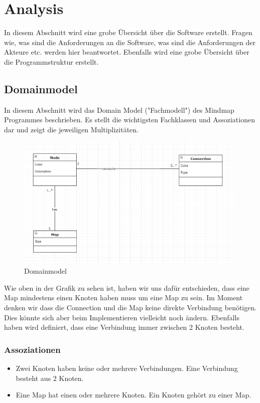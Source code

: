 \chapter{Analysis}
\label{chap:analysis}

In diesem Abschnitt wird eine grobe Übersicht über die Software erstellt. Fragen wie, was sind die Anforderungen an die Software, was sind die Anforderungen der Akteure etc. werden hier beantwortet. Ebenfalls wird eine grobe Übersicht über die Programmstruktur erstellt.

\section{Domainmodel}
\label{sec:domain_model}
In diesem Abschnitt wird das Domain Model ("{}Fachmodell"{}) des Mindmap Programmes beschrieben. Es stellt die 
wichtigsten Fachklassen und Assoziationen dar und zeigt die jeweiligen Multiplizitäten.

\begin{figure}[H]
	\centering
		\includegraphics[width=\textwidth]{images/DomainModel.png}
	\caption{Domainmodel}
	\label{fig:domain_model}
\end{figure}

Wie oben in der Grafik zu sehen ist, haben wir uns dafür entschieden, dass eine Map mindestens einen Knoten haben muss um eine Map zu sein. Im Moment denken wir dass die Connection und die Map keine direkte Verbindung benötigen. Dies könnte sich aber beim Implementieren vielleicht noch ändern. Ebenfalls haben wird definiert, dass eine Verbindung immer zwischen 2 Knoten besteht.

\subsection{Assoziationen}
\label{subsec:assoziationen}
\begin{itemize}
\item Zwei Knoten haben keine oder mehrere Verbindungen. Eine Verbindung besteht aus 2 Knoten.
\item Eine Map hat einen oder mehrere Knoten. Ein Knoten gehört zu einer Map.
\end{itemize}

